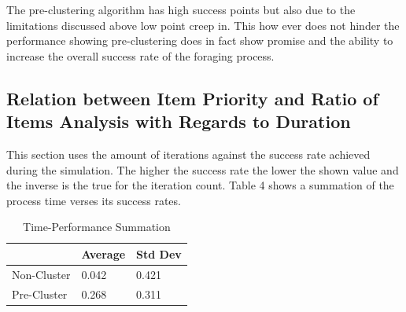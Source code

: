 \documentclass[12pt]{article}
\begin{document}
\par{The pre-clustering algorithm has high success points but also due to the limitations discussed above low point creep in. This how ever does not hinder the performance showing pre-clustering does in fact show promise and the ability to increase the overall success rate of the foraging process.}

\subsection{Relation between Item Priority and Ratio of Items Analysis with Regards to Duration}

\par{This section uses the amount of iterations against the success rate achieved during the simulation. The higher the success rate the lower the shown value and the inverse is the true for the iteration count. Table 4 shows a summation of the process time verses its success rates.}
\\
\begin{table}[h]
\centering
\begin{tabular}{|l|l|l|}
\hline
            & Average & Std Dev \\ \hline
Non-Cluster & 0.042   & 0.421   \\ \hline
Pre-Cluster & 0.268   & 0.311   \\ \hline
\end{tabular}
\caption{Time-Performance Summation}
\label{my-label}
\end{table}
\end{document}
